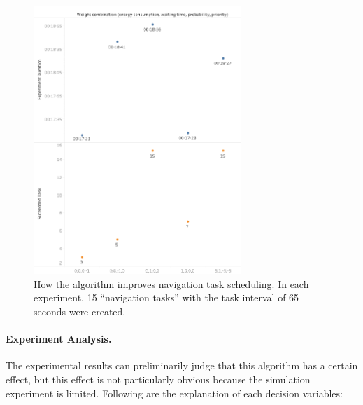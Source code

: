\begin{figure}[htbp]
 \centering
 \includegraphics[width = 0.7\textwidth]{content/images/ch5/improvement_evaluation_65s.png}
 \caption{How the algorithm improves navigation task scheduling. In each experiment, 15 ``navigation tasks'' with the task interval of 65 seconds were created.}
 \label{fig:improvement_evaluation}
\end{figure}

\paragraph{Experiment Analysis.} 


The experimental results can preliminarily judge that this algorithm has a certain effect, but this effect is not particularly obvious because the simulation experiment is limited. Following are the explanation of each decision variables:

